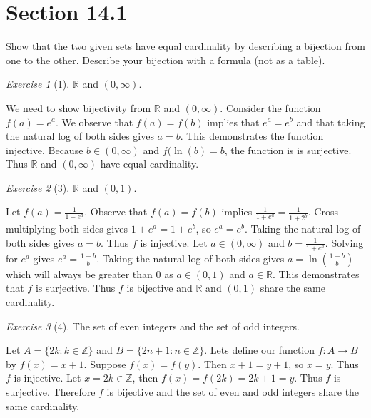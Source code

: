 \documentclass[12pt]{amsart}
\makeatletter
\theoremstyle{remark}
\newtheorem*{exercise}{Exercise}%
\def\RR{\ensuremath{\mathbb R}}
\def\ZZ{\ensuremath{\mathbb Z}}
\renewenvironment{proof}[1][\proofname]{\par\doublespacing
  \pushQED{\qed}%
  \normalfont \topsep6\p@\@plus6\p@\relax
  \list{}{%
    \settowidth{\leftmargin}{\itshape\proofname:\hskip\labelsep}%
    \setlength{\labelwidth}{0pt}%
    \setlength{\itemindent}{-\leftmargin}%
  }%
  \item[\hskip\labelsep\itshape#1\@addpunct{:}]\ignorespaces
}{%
  \popQED\endlist\@endpefalse
  \singlespacing
}
\theoremstyle{mycomment}
\makeatother
\begin{document}
\thispagestyle{fancy}

\section*{Section 14.1}
Show that the two given sets have equal cardinality by describing a bijection from one to the other. Describe your bijection with a formula (not as a table).
\begin{exercise}[1] $\RR$ and $(0,\infty)$.
\begin{proof}[Solution]
	We need to show bijectivity from $\RR$ and $(0, \infty)$. Consider the function $f(a) = e^a$. We observe that $f(a) = f(b)$ implies that $e^a = e^b$ and that taking the natural log of both sides gives $a = b$. This demonstrates the function injective. Because $b \in (0, \infty)$ and $f(\ln{(b)} = b$, the function is is surjective. Thus $\RR$ and $(0,\infty)$ have equal cardinality.
\end{proof}
\end{exercise}

\begin{exercise}[3] $\RR$ and $(0,1)$.
\begin{proof}[Solution]
	Let $f(a) = \frac{1}{1+e^{a}}$. Observe that $f(a) = f(b)$ implies $\frac{1}{1+e^{a}} = \frac{1}{1+2^{b}}$. Cross-multiplying both sides gives $1 + e^{a} = 1 + e^{b}$, so $e^a = e^b$. Taking the natural log of both sides gives $a = b$. Thus $f$ is injective. Let $a \in (0, \infty)$ and $b = \frac{1}{1+e^a}$. Solving for $e^a$ gives $e^a = \frac{1-b}{b}$. Taking the natural log of both sides gives $a = \ln{(\frac{1-b}{b})}$ which will always be greater than 0 as $a \in (0, 1)$ and $a \in \RR$. This demonstrates that $f$ is surjective. Thus $f$ is bijective and $\RR$ and $(0, 1)$ share the same cardinality.
\end{proof}
\end{exercise}

\begin{exercise}[4] The set of even integers and the set of odd integers.
\begin{proof}
	Let $A = \{2k: k \in \ZZ\}$ and $B = \{2n+1:n \in \ZZ \}$. Lets define our function $f: A \rightarrow B$ by $f(x) = x+1$. Suppose $f(x) = f(y)$. Then $x + 1 = y + 1$, so $x = y$. Thus $f$ is injective. Let $x = 2k \in \ZZ$, then $f(x) = f(2k) = 2k+1 = y$. Thus $f$ is surjective. Therefore $f$ is bijective and the set of even and odd integers share the same cardinality.
\end{proof}
\end{exercise}
\end{document}
